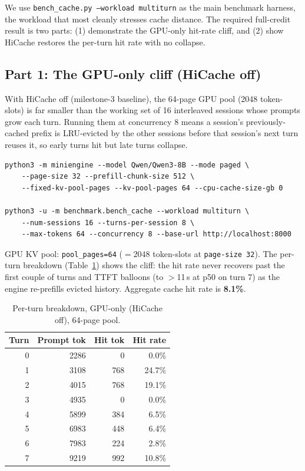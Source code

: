 \documentclass[11pt]{article}
\begin{document}
We use \texttt{bench\_cache.py --workload multiturn} as the main benchmark harness, the workload that most cleanly stresses cache distance. The required full-credit result is two parts: (1) demonstrate the GPU-only hit-rate cliff, and (2) show HiCache restores the per-turn hit rate with no collapse.

\subsection{Part 1: The GPU-only cliff (HiCache off)}
\label{sec:cliff}

With HiCache off (milestone-3 baseline), the 64-page GPU pool (2048 token-slots) is far smaller than the working set of 16 interleaved sessions whose prompts grow each turn. Running them at concurrency 8 means a session's previously-cached prefix is LRU-evicted by the other sessions before that session's next turn reuses it, so early turns hit but late turns collapse.

\begin{verbatim}
python3 -m miniengine --model Qwen/Qwen3-8B --mode paged \
    --page-size 32 --prefill-chunk-size 512 \
    --fixed-kv-pool-pages --kv-pool-pages 64 --cpu-cache-size-gb 0

python3 -u -m benchmark.bench_cache --workload multiturn \
    --num-sessions 16 --turns-per-session 8 \
    --max-tokens 64 --concurrency 8 --base-url http://localhost:8000
\end{verbatim}

\noindent GPU KV pool: \texttt{pool\_pages=64} ($=2048$ token-slots at \texttt{page-size 32}). The per-turn breakdown (Table~\ref{tab:cliff}) shows the cliff: the hit rate never recovers past the first couple of turns and TTFT balloons (to $>$11\,s at p50 on turn 7) as the engine re-prefills evicted history. Aggregate cache hit rate is \textbf{8.1\%}.

\begin{table}[htbp]
  \centering
  \caption{Per-turn breakdown, GPU-only (HiCache off), 64-page pool.}
  \label{tab:cliff}
  \begin{tabular}{@{}rrrr@{}}
    \toprule
    Turn & Prompt tok & Hit tok & Hit rate \\
    \midrule
    0 & 2286 &    0 &  0.0\% \\
    1 & 3108 &  768 & 24.7\% \\
    2 & 4015 &  768 & 19.1\% \\
    3 & 4935 &    0 &  0.0\% \\
    4 & 5899 &  384 &  6.5\% \\
    5 & 6983 &  448 &  6.4\% \\
    6 & 7983 &  224 &  2.8\% \\
    7 & 9219 &  992 & 10.8\% \\
    \bottomrule
  \end{tabular}
\end{table}
\end{document}
